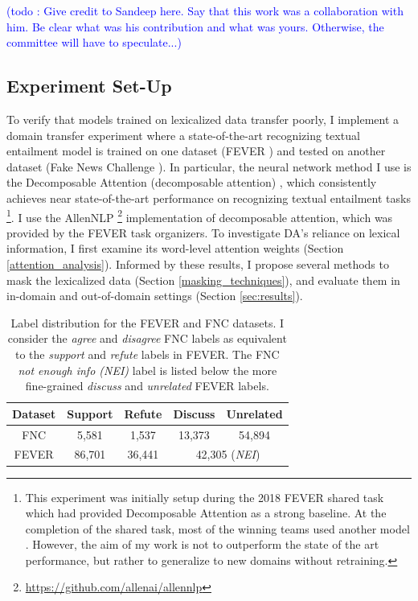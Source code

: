 \documentclass{article}
\newcommand\todo[1]{\textcolor{blue}{(todo : #1)}}
\begin{document}
\todo{Give credit to Sandeep here. Say that this work was a collaboration with him. Be clear what was his contribution and what was yours. Otherwise, the committee will have to speculate...}



\subsection{Experiment Set-Up}
 
To verify that models trained on lexicalized data transfer poorly, I implement a domain transfer experiment where a state-of-the-art recognizing textual entailment model is trained on one dataset (FEVER \citep*{thorne2018fever}) and tested on another dataset (Fake News Challenge \citep*{pomerleau2017fake}). In particular, the neural network method I use is the Decomposable Attention (decomposable attention) \citep*{parikh2016decomposable}, which consistently achieves near state-of-the-art performance on recognizing textual entailment tasks \footnote{This experiment was initially setup during the 2018 FEVER shared task which had provided Decomposable Attention as a strong baseline. At the completion of the shared task, most of the winning teams used another model \citep*{chen2016enhanced}. However, the aim of my work is not to outperform the state of the art performance, but rather to generalize to new domains without retraining.}.  I use the AllenNLP \footnote{\url{https://github.com/allenai/allennlp}}
implementation of decomposable attention, which was provided by the FEVER task organizers. To investigate DA's reliance on lexical information, I first examine its word-level attention weights (Section \ref{attention_analysis}). 
Informed by these results, I propose several methods to mask the lexicalized data (Section \ref{masking_techniques}), and evaluate them in in-domain and  out-of-domain settings (Section \ref{sec:results}).




\begin{table}[t]
    \centering
    \footnotesize
    \begin{tabular}{ccccc}
        Dataset & Support & Refute & Discuss & Unrelated \\
        \hline
        FNC    & 5,581 & 1,537  & 13,373 & 54,894 \\
        FEVER  &  86,701 & 36,441  & \multicolumn{2}{c}{42,305 (\textit{NEI})} \\  
    \end{tabular}
    \caption{Label distribution for the FEVER and FNC datasets.  I consider the \textit{agree} and \textit{disagree} FNC labels as equivalent to the \textit{support} and \textit{refute} labels in FEVER. The FNC \textit{not enough info (NEI)} label is listed below the more fine-grained \textit{discuss} and \textit{unrelated} FEVER labels.  }
    \label{tab:data}
\end{table}
\end{document}
